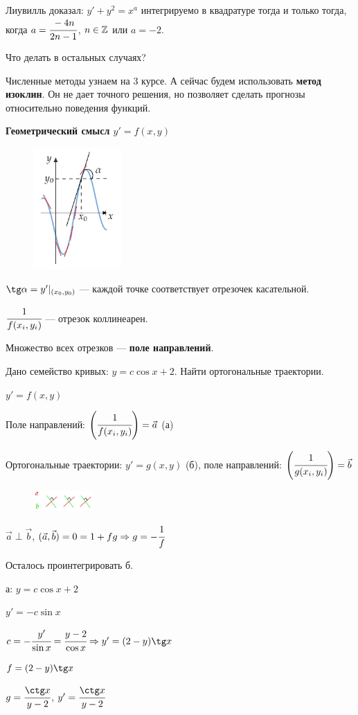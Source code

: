 Лиувилль доказал: $y' + y^2 = x^a$ интегрируемо в квадратуре тогда и только тогда, когда $a = \cfrac{-4n}{2n - 1}$, $n \in \mathbb{Z}$ или $a = -2$.

Что делать в остальных случаях?

\Smiley Численные методы узнаем на 3 курсе. А сейчас будем использовать \textbf{метод изоклин}. Он не дает точного решения, но позволяет сделать прогнозы относительно поведения функций.

\begin{center}
    \textbf{Геометрический смысл $y' = f(x, y)$}
\end{center}
\begin{figure}[!ht]
		\centering
		\includegraphics[width=0.3\textwidth]{images/p2.jpg}
\end{figure}

$\tg \alpha = y' |_{(x_0, y_0)}$ --- каждой точке соответствует отрезочек касательной.

$\cfrac{1}{f(x_i, y_i)}$ --- отрезок коллинеарен.

Множество всех отрезков --- \textbf{поле направлений}.
\begin{problem}
    Дано семейство кривых: $y = c \cos x + 2$. Найти ортогональные траектории.
    
    $y' = f(x,y)$
    
    Поле направлений: $\left({\cfrac{1}{f(x_i, y_i)}}\right) = \vec{a}$ (а)
    
    Ортогональные траектории: $y' = g(x, y)$ (б), поле направлений: $\left({\cfrac{1}{g(x_i, y_i)} }\right)= \vec{b}$
    \begin{figure}[!ht]
		\includegraphics[width=0.2\textwidth]{images/p3.jpg}
\end{figure}
$\vec{a} \perp \vec{b}$, $(\vec{a}, \vec{b}) = 0 = 1 + fg \Rightarrow g = -\cfrac{1}{f}$

Осталось проинтегрировать б.

а: $y = c \cos x + 2$

$y' = -c \sin x$

$c = -\cfrac{y'}{\sin x} = \cfrac{y - 2}{\cos x} \Rightarrow y' = (2 - y) \tg x$

$f = (2 - y) \tg x$

$g = \cfrac{\ctg x}{y - 2}$, $y' = \cfrac{\ctg x}{y - 2}$
\end{problem}

